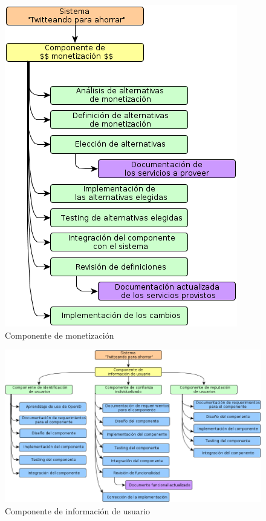 \begin{figure}[H]
\centering
\includegraphics[scale=\escaladefault]{graficos/wbs/comp_monetizacion.png}
\caption{Componente de monetización}
\end{figure}

\begin{figure}[H]
\centering
\includegraphics[scale=\escaladefault]{graficos/wbs/comp_de_info_de_usuario.png}
\caption{Componente de información de usuario}
\end{figure}
